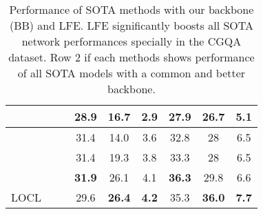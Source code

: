 \documentclass{bmvc2k}
\newcommand{\cmark}{\ding{51}}\newcommand{\xmark}{\ding{55}}\definecolor{darkmagenta}{RGB}{127,0,127}
\newcommand{\tablelightgray}{\rowcolor[gray]{.95}}
\begin{document}
\begin{table}[t]
{\begin{tabular}{ccc|ccc|ccc}
                         \tablelightgray& \cmark                                                                  & \cmark               & 28.9                     & 16.7                      & 2.9                      & 27.9                     & 26.7                       & 5.1                      \\ \hline
\tablelightgray
\multirow{3}{*}{CGE~\cite{naeem2021learning}}     & \xmark                                                                  & \xmark               & 31.4                     & 14.0                       & 3.6                      & 32.8                     & 28                         & 6.5                      \\
                         & \cmark                                                                  & \xmark               & 31.4                     & 19.3                      & 3.8                      & 33.3                     & 28                         & 6.5                      \\
                         \tablelightgray& \cmark                                                                  & \cmark               & \textbf{31.9}                     & 26.1                       & 4.1                     & \textbf{36.3}                     & 29.8                       & 6.6                      \\ \hline
LOCL                    & \cmark                                                                  & \cmark               & 29.6            & \textbf{26.4}              & \textbf{4.2}            & 35.3            & \textbf{36.0}              & \textbf{7.7}             \\ \hline
\end{tabular}
}
\vspace{0.2cm}
\caption{Performance of SOTA methods with our backbone (BB) and LFE. LFE significantly boosts all SOTA network performances specially in the CGQA dataset. Row 2 if each methods shows performance of all SOTA models with a common and better backbone.}
\label{tab:ablation}
\vspace{-0.3cm}


\end{table}
\end{document}
